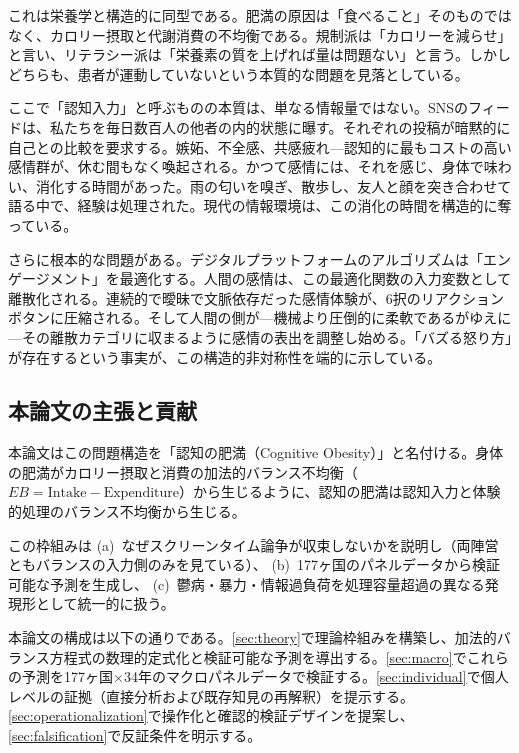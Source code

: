 \documentclass[a4paper,11pt,titlepage]{article}
\begin{document}
これは栄養学と構造的に同型である。肥満の原因は「食べること」そのものではなく、カロリー摂取と代謝消費の不均衡である。規制派は「カロリーを減らせ」と言い、リテラシー派は「栄養素の質を上げれば量は問題ない」と言う。しかしどちらも、患者が運動していないという本質的な問題を見落としている。

ここで「認知入力」と呼ぶものの本質は、単なる情報量ではない。SNSのフィードは、私たちを毎日数百人の他者の内的状態に曝す。それぞれの投稿が暗黙的に自己との比較を要求する。嫉妬、不全感、共感疲れ---認知的に最もコストの高い感情群が、休む間もなく喚起される。かつて感情には、それを感じ、身体で味わい、消化する時間があった。雨の匂いを嗅ぎ、散歩し、友人と顔を突き合わせて語る中で、経験は処理された。現代の情報環境は、この消化の時間を構造的に奪っている。

さらに根本的な問題がある。デジタルプラットフォームのアルゴリズムは「エンゲージメント」を最適化する。人間の感情は、この最適化関数の入力変数として離散化される。連続的で曖昧で文脈依存だった感情体験が、6択のリアクションボタンに圧縮される。そして人間の側が---機械より圧倒的に柔軟であるがゆえに---その離散カテゴリに収まるように感情の表出を調整し始める。「バズる怒り方」が存在するという事実が、この構造的非対称性を端的に示している。

\subsection{本論文の主張と貢献}

本論文はこの問題構造を「認知の肥満（Cognitive Obesity）」と名付ける。身体の肥満がカロリー摂取と消費の加法的バランス不均衡（$EB = \text{Intake} - \text{Expenditure}$）から生じるように、認知の肥満は認知入力と体験的処理のバランス不均衡から生じる。

この枠組みは
(a)~なぜスクリーンタイム論争が収束しないかを説明し（両陣営ともバランスの入力側のみを見ている）、
(b)~177ヶ国のパネルデータから検証可能な予測を生成し、
(c)~鬱病・暴力・情報過負荷を処理容量超過の異なる発現形として統一的に扱う。

本論文の構成は以下の通りである。\cref{sec:theory}で理論枠組みを構築し、加法的バランス方程式の数理的定式化と検証可能な予測を導出する。\cref{sec:macro}でこれらの予測を177ヶ国$\times$34年のマクロパネルデータで検証する。\cref{sec:individual}で個人レベルの証拠（直接分析および既存知見の再解釈）を提示する。\cref{sec:operationalization}で操作化と確認的検証デザインを提案し、\cref{sec:falsification}で反証条件を明示する。


\end{document}
